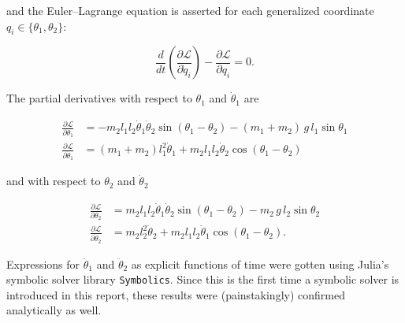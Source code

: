 and the Euler--Lagrange equation is asserted for each generalized coordinate $q_i \in \{\theta_1, \theta_2\}$:

\begin{equation}
    \frac{d}{dt}\left( \frac{\partial \mathcal{L}}{\partial \dot{q}_i} \right) - \frac{\partial \mathcal{L}}{\partial q_i} = 0.
\end{equation}

The partial derivatives with respect to $\theta_1$ and $\dot\theta_1$ are

\begin{align}
    \frac{\partial \mathcal{L}}{\partial \theta_1} &= -m_2l_1l_2\dot\theta_1\dot\theta_2\sin(\theta_1-\theta_2) - (m_1+m_2)\,g\,l_1\sin\theta_1 \\
    \frac{\partial \mathcal{L}}{\partial \dot\theta_1} &= (m_1+m_2)l_1^2\dot\theta_1 + m_2l_1l_2\dot\theta_2\cos(\theta_1-\theta_2)
\end{align}

and with respect to $\theta_2$ and $\dot\theta_2$

\begin{align}
    \frac{\partial \mathcal{L}}{\partial \theta_2} &= m_2l_1l_2\dot\theta_1\dot\theta_2\sin(\theta_1-\theta_2) - m_2\,g\,l_2\sin\theta_2 \\
    \frac{\partial \mathcal{L}}{\partial \dot\theta_2} &= m_2l_2^2\dot\theta_2 + m_2l_1l_2\dot\theta_1\cos(\theta_1-\theta_2).
\end{align}

Expressions for $\ddot{\theta}_1$ and $\ddot{\theta}_2$ as explicit functions of time were gotten using Julia's symbolic solver library \texttt{Symbolics}. Since this is the first time a symbolic solver is introduced in this report, these results were (painstakingly) confirmed analytically as well.

